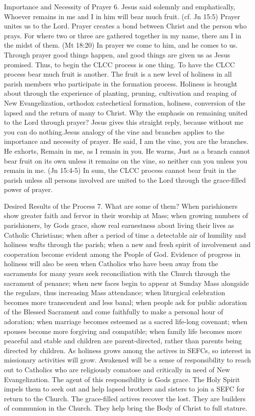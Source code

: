 \documentclass[oneside]{book}
\begin{document}
Importance and Necessity of Prayer 6. Jesus said solemnly and emphatically,
Whoever remains in me and I in him will bear much fruit. (cf. Jn 15:5) Prayer
unites us to the Lord. Prayer creates a bond between Christ and the person who
prays. For where two or three are gathered together in my name, there am I in
the midst of them. (Mt 18:20) In prayer we come to him, and he comes to
us. Through prayer good things happen, and good things are given us as Jesus
promised. Thus, to begin the CLCC process is one thing. To have the CLCC process
bear much fruit is another. The fruit is a new level of holiness in all parish
members who participate in the formation process. Holiness is brought about
through the experience of planting, pruning, cultivation and reaping of New
Evangelization, orthodox catechetical formation, holiness, conversion of the
lapsed and the return of many to Christ.  Why the emphasis on remaining united
to the Lord through prayer? Jesus gives this straight reply, because without me
you can do nothing.Jesus analogy of the vine and branches applies to the
importance and necessity of prayer. He said, I am the vine, you are the
branches. He exhorts, Remain in me, as I remain in you. He warns, Just as a
branch cannot bear fruit on its own unless it remains on the vine, so neither
can you unless you remain in me. (Jn 15:4-5) In sum, the CLCC process cannot
bear fruit in the parish unless all persons involved are united to the Lord
through the grace-filled power of prayer.

Desired Results of the Process 7. What are some of them? When parishioners show
greater faith and fervor in their worship at Mass; when growing numbers of
parishioners, by Gods grace, show real earnestness about living their lives as
Catholic Christians; when after a period of time a detectable air of humility
and holiness wafts through the parish; when a new and fresh spirit of
involvement and cooperation become evident among the People of God.  Evidence of
progress in holiness will also be seen when Catholics who have been away from
the sacraments for many years seek reconciliation with the Church through the
sacrament of penance; when new faces begin to appear at Sunday Mass alongside
the regulars, thus increasing Mass attendance; when liturgical celebration
becomes more transcendent and less banal; when people ask for public adoration
of the Blessed Sacrament and come faithfully to make a personal hour of
adoration; when marriage becomes esteemed as a sacred life-long covenant; when
spouses become more forgiving and compatible; when family life becomes more
peaceful and stable and children are parent-directed, rather than parents being
directed by children.  As holiness grows among the actives in SEFCs, so interest
in missionary activities will grow. Awakened will be a sense of responsibility
to reach out to Catholics who are religiously comatose and critically in need of
New Evangelization. The agent of this responsibility is Gods grace. The Holy
Spirit impels them to seek out and help lapsed brothers and sisters to join a
SEFC for return to the Church. The grace-filled actives recover the lost. They
are builders of communion in the Church. They help bring the Body of Christ to
full stature.
\end{document}
